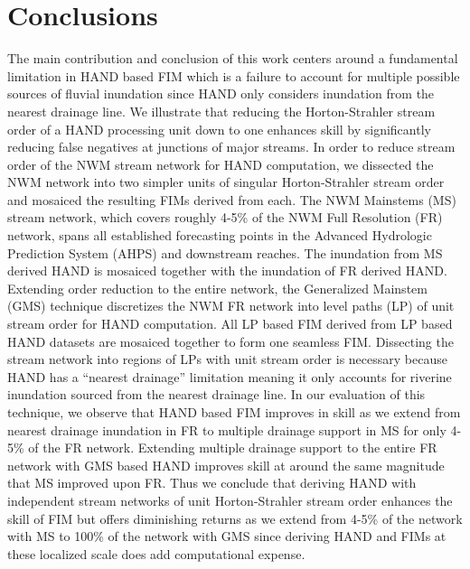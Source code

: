 \section{Conclusions}
\label{sec:conclusions}
%
The main contribution and conclusion of this work centers around a fundamental limitation in HAND based FIM which is a failure to account for multiple possible sources of fluvial inundation since HAND only considers inundation from the nearest drainage line.
We illustrate that reducing the Horton-Strahler stream order of a HAND processing unit down to one enhances skill by significantly reducing false negatives at junctions of major streams.
In order to reduce stream order of the NWM stream network for HAND computation, we dissected the NWM network into two simpler units of singular Horton-Strahler stream order and mosaiced the resulting FIMs derived from each.
The NWM Mainstems (MS) stream network, which covers roughly 4-5\% of the NWM Full Resolution (FR) network, spans all established forecasting points in the Advanced Hydrologic Prediction System (AHPS) and downstream reaches.
The inundation from MS derived HAND is mosaiced together with the inundation of FR derived HAND.
Extending order reduction to the entire network, the Generalized Mainstem (GMS) technique discretizes the NWM FR network into level paths (LP) of unit stream order for HAND computation.
All LP based FIM derived from LP based HAND datasets are mosaiced together to form one seamless FIM.
Dissecting the stream network into regions of LPs with unit stream order is necessary because HAND has a ``nearest drainage'' limitation meaning it only accounts for riverine inundation sourced from the nearest drainage line.
In our evaluation of this technique, we observe that HAND based FIM improves in skill as we extend from nearest drainage inundation in FR to multiple drainage support in MS for only 4-5\% of the FR network.
Extending multiple drainage support to the entire FR network with GMS based HAND improves skill at around the same magnitude that MS improved upon FR.
Thus we conclude that deriving HAND with independent stream networks of unit Horton-Strahler stream order enhances the skill of FIM but offers diminishing returns as we extend from 4-5\% of the network with MS to 100\% of the network with GMS since deriving HAND and FIMs at these localized scale does add computational expense.

